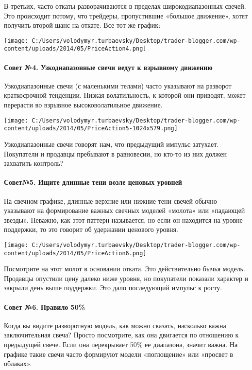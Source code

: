 \documentclass[a5paper]{article}
\begin{document}
В-третьих, часто откаты разворачиваются в пределах широкодиапазонных
свечей. Это происходит потому, что трейдеры, пропустившие «большое
движение», хотят получить второй шанс на откате. Все тот же график:

\texttt{[image: C:/Users/volodymyr.turbaevsky/Desktop/trader-blogger.com/wp-content/uploads/2014/05/PriceAction4.png]}


\paragraph{Совет №4. Узкодиапазонные свечи ведут к взрывному
  движению}

Узкодиапазонные свечи (с маленькими телами) часто указывают на
разворот краткосрочной тенденции. Низкая волатильность, к которой они
приводят, может перерасти во взрывное высоковолатильное движение.

\texttt{[image: C:/Users/volodymyr.turbaevsky/Desktop/trader-blogger.com/wp-content/uploads/2014/05/PriceAction5-1024x579.png]}

Узкодиапазонные свечи говорят нам, что предыдущий импульс
затухает. Покупатели и продавцы пребывают в равновесии, но кто-то из
них должен захватить контроль?

\paragraph{Совет№5. Ищите длинные тени возле ценовых уровней}

На свечном графике, длинные верхние или нижние тени свечей обычно
указывают на формирование важных свечных моделей «молота» или
«падающей звезды». Неважно, как этот паттерн называется, но если он
находится на уровне поддержки, то это говорит об удержании ценового
уровня.

\texttt{[image: C:/Users/volodymyr.turbaevsky/Desktop/trader-blogger.com/wp-content/uploads/2014/05/PriceAction6.png]}

Посмотрите на этот молот в основании отката. Это действительно бычья
модель. Продавцы опустили цену далеко ниже уровня, но покупатели
показали характер и закрыли день выше поддержки. Это дало последующий
импульс к росту.

\paragraph{Совет №6. Правило 50\%}

Когда вы видите разворотную модель, как можно сказать, насколько важна
заключительная свеча? Просто посмотрите, как она двигается по
отношению к предыдущей свече. Если она перекрывает 50\% ее диапазона,
значит важна. На графике такие свечи часто формируют модели
«поглощение» или «просвет в облаках».
\end{document}
